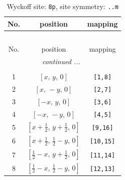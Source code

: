 \documentclass[fleqn,8pt]{jsarticle}
\begin{document}
\begin{longtable}{ccc}
\caption{Wyckoff site: {\tt 8p}, site symmetry: {\tt ..m}}
 \\
 \hline \hline
No. & position & mapping \\ \hline \endfirsthead

\multicolumn{2}{l}{\tablename\ \thetable{}} \\
 \hline \hline
No. & position & mapping \\ \hline \endhead

 \hline \hline
\multicolumn{2}{r}{\footnotesize\it continued ...} \\ \endfoot

 \hline \hline
\multicolumn{2}{r}{} \\ \endlastfoot

1 & $\left[ x,\, y,\, 0 \right]$ & {\tt [1,8]} \\ \hline
2 & $\left[ x,\, - y,\, 0 \right]$ & {\tt [2,7]} \\ \hline
3 & $\left[ - x,\, y,\, 0 \right]$ & {\tt [3,6]} \\ \hline
4 & $\left[ - x,\, - y,\, 0 \right]$ & {\tt [4,5]} \\ \hline
5 & $\left[ x + \frac{1}{2},\, y + \frac{1}{2},\, 0 \right]$ & {\tt [9,16]} \\ \hline
6 & $\left[ x + \frac{1}{2},\, \frac{1}{2} - y,\, 0 \right]$ & {\tt [10,15]} \\ \hline
7 & $\left[ \frac{1}{2} - x,\, y + \frac{1}{2},\, 0 \right]$ & {\tt [11,14]} \\ \hline
8 & $\left[ \frac{1}{2} - x,\, \frac{1}{2} - y,\, 0 \right]$ & {\tt [12,13]} \\
\end{longtable}
\renewcommand{\arraystretch}{1.2}
\end{document}
